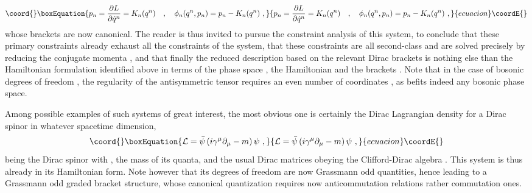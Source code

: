 \documentclass[a4paper,11pt]{article}
\begin{document}
\begin{equation}\coord{}\boxEquation{
p_n=\frac{\partial L}{\partial\dot{q}^n}=K_n(q^n)\ \ \ ,\ \ \ 
\phi_n(q^n,p_n)=p_n-K_n(q^n)\ ,
}{
p_n=\frac{\partial L}{\partial\dot{q}^n}=K_n(q^n)\ \ \ ,\ \ \ 
\phi_n(q^n,p_n)=p_n-K_n(q^n)\ ,
}{ecuacion}\coordE{}\end{equation}
whose brackets \coordHE{} are now canonical. The reader
is thus invited to pursue the constraint analysis of this system, to
conclude that these primary constraints \myHighlight{$\phi_n=0$}\coordHE{} already exhaust all
the constraints of the system, that these constraints are all second-class
and are solved precisely by reducing the conjugate momenta \myHighlight{$p_n=K_n(q^n)$}\coordHE{}, 
and that finally the reduced description based on the relevant Dirac brackets 
is nothing else than the Hamiltonian formulation identified above in terms of
the phase space \myHighlight{$\{q^n\}$}\coordHE{}, the Hamiltonian \coordHE{} and the
brackets \myHighlight{$\{q^n,q^m\}=(K^{-1})^{nm}$}\coordHE{}. Note that in the case of bosonic degrees
of freedom \myHighlight{$q^n$}\coordHE{}, the regularity of the antisymmetric tensor \myHighlight{$K_{nm}$}\coordHE{}
requires an even number of coordinates \myHighlight{$q^n$}\coordHE{}, as befits indeed any bosonic
phase space.

Among possible examples of such systems of great interest, the most
obvious one is certainly the Dirac Lagrangian density for a Dirac spinor
in whatever spacetime dimension,
\begin{equation}\coord{}\boxEquation{
{\cal L}=\bar{\psi}\left(i\gamma^\mu\partial_\mu-m\right)\psi\ ,
}{
{\cal L}=\bar{\psi}\left(i\gamma^\mu\partial_\mu-m\right)\psi\ ,
}{ecuacion}\coordE{}\end{equation}
\myHighlight{$\psi$}\coordHE{} being the Dirac spinor with \coordHE{},
\myHighlight{$m$}\coordHE{} the mass of its quanta, and \myHighlight{$\gamma^\mu$}\coordHE{} the usual Dirac
matrices obeying the Clifford-Dirac algebra 
\myHighlight{$\{\gamma^\mu,\gamma^\nu\}=2\eta^{\mu\nu}$}\coordHE{}. This system is thus already
in its Hamiltonian form. Note however that its degrees of freedom \coordHE{}
are now Grassmann odd quantities, hence leading to a Grassmann odd
graded bracket structure, whose canonical quantization requires now
anticommutation relations rather commutation ones.

\vspace{10pt}
\end{document}
